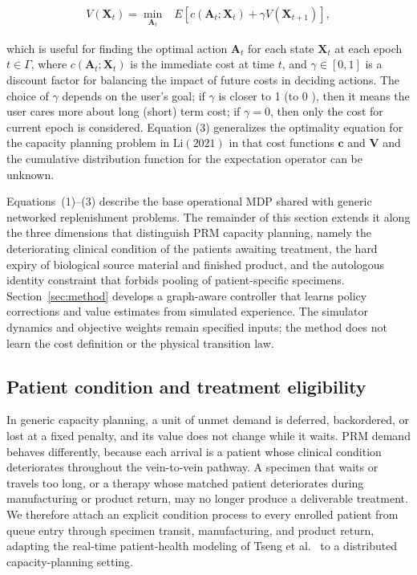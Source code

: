\documentclass[preprint,review,12pt]{elsarticle}
\begin{document}
\begin{equation}
\begin{array}{ll}
 V\left( \mathbf{X}_{t}\right)= 
 \min _{\mathbf{A}_{t}} & E\left[c\left(\mathbf{A}_{t} ; \mathbf{X}_{t}\right)+\gamma  V\left(\mathbf{X}_{t+1}\right)\right],
\end{array}
\end{equation}

which is useful for finding the optimal action $\mathbf{A}_{t}$ for each state $\mathbf{X}_{t}$ at each epoch $t \in \Gamma$, where $c\left(\mathbf{A}_{t} ; \mathbf{X}_{t}\right)$ is the immediate cost at time $t$, and $\gamma \in[0,1]$ is a discount factor for balancing the impact of future costs in deciding actions. The choice of $\gamma$ depends on the user's goal; if $\gamma$ is closer to 1 (to 0 ), then it means the user cares more about long (short) term cost; if $\gamma=0$, then only the cost for current epoch is considered. Equation (3) generalizes the optimality equation for the capacity planning problem in $\mathrm{Li}(2021)$ \cite{Li2023} in that cost functions \textit{$\mathbf{c}$} and $\mathbf{V}$ and the cumulative distribution function for the expectation operator can be unknown.

Equations~(1)--(3) describe the base operational MDP shared with generic networked replenishment problems. The remainder of this section extends it along the three dimensions that distinguish PRM capacity planning, namely the deteriorating clinical condition of the patients awaiting treatment, the hard expiry of biological source material and finished product, and the autologous identity constraint that forbids pooling of patient-specific specimens. Section~\ref{sec:method} develops a graph-aware controller that learns policy corrections and value estimates from simulated experience. The simulator dynamics and objective weights remain specified inputs; the method does not learn the cost definition or the physical transition law.

\subsection{Patient condition and treatment eligibility}
\label{sec:problem-patient}

In generic capacity planning, a unit of unmet demand is deferred, backordered, or lost at a fixed penalty, and its value does not change while it waits. PRM demand behaves differently, because each arrival is a patient whose clinical condition deteriorates throughout the vein-to-vein pathway. A specimen that waits or travels too long, or a therapy whose matched patient deteriorates during manufacturing or product return, may no longer produce a deliverable treatment. We therefore attach an explicit condition process to every enrolled patient from queue entry through specimen transit, manufacturing, and product return, adapting the real-time patient-health modeling of Tseng et al.~\cite{Tseng2024PatientHealth} to a distributed capacity-planning setting.
\end{document}
